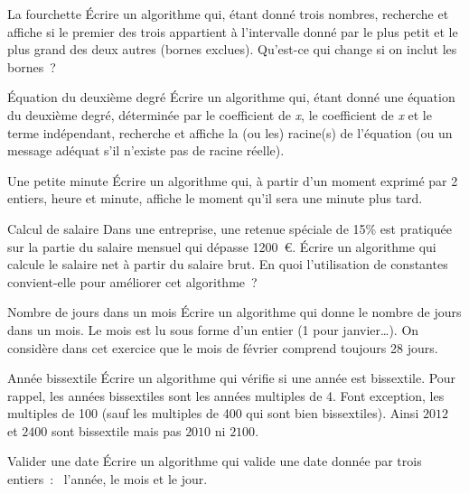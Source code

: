 \begin{Exercice}{La fourchette}
	Écrire un algorithme qui, étant donné trois nombres, 
	recherche et affiche si le premier des trois 
	appartient à l’intervalle donné par le plus petit et le plus grand 
	des deux autres (bornes exclues). 
	Qu’est-ce qui change si on inclut les bornes~?
\end{Exercice}

\begin{Exercice}{Équation du deuxième degré}
	Écrire un algorithme qui, 
	étant donné une équation du deuxième degré, 
	déterminée par le coefficient de \textit{x},
	le coefficient de \textit{x} et le terme indépendant, 
	recherche et affiche la (ou les) racine(s) de l’équation 
	(ou un message adéquat s’il n’existe pas de racine réelle).
\end{Exercice}

\begin{Exercice}{Une petite minute}
	Écrire un algorithme qui, à partir d’un moment exprimé par 2 entiers, 
	heure et minute, affiche le moment qu’il sera une minute plus tard.
\end{Exercice}

\begin{Exercice}{Calcul de salaire}
	Dans une entreprise, 
	une retenue spéciale de 15\% est pratiquée 
	sur la partie du salaire mensuel qui dépasse 1200~\euro. 
	Écrire un algorithme qui calcule le salaire net à partir du salaire brut. 
	En quoi l’utilisation de constantes convient-elle pour améliorer cet algorithme~?
\end{Exercice}

\begin{Exercice}{Nombre de jours dans un mois}
	Écrire un algorithme qui donne le nombre de jours dans un mois. 
	Le mois est lu sous forme d’un entier (1 pour janvier\dots).
	On considère dans cet exercice que le mois de février
	comprend toujours 28 jours.
\end{Exercice}

\begin{Exercice}{Année bissextile}
	Écrire un algorithme qui vérifie si une année est bissextile. 
	Pour rappel, les années bissextiles sont les années multiples de 4. 
	Font exception, les multiples de 100 
	(sauf les multiples de 400 qui sont bien bissextiles). 
	Ainsi $2012$ et $2400$ sont bissextile mais pas $2010$ ni $2100$.
\end{Exercice}

\begin{Exercice}{Valider une date}
	Écrire un algorithme qui valide une date donnée par trois entiers~:~
	l’année, le mois et le jour.
\end{Exercice}

